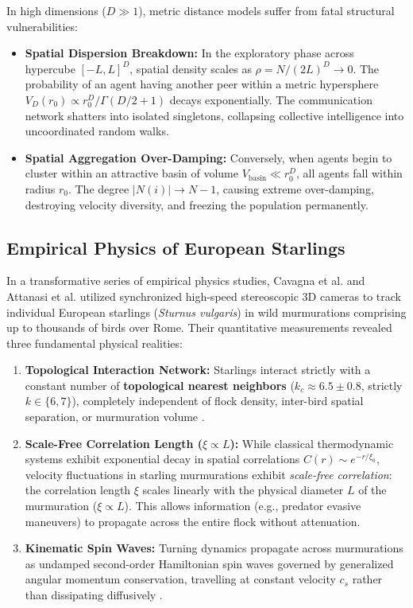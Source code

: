 \documentclass[journal]{IEEEtran}
\begin{document}
In high dimensions ($D \gg 1$), metric distance models suffer from fatal structural vulnerabilities:
\begin{itemize}
    \item \textbf{Spatial Dispersion Breakdown:} In the exploratory phase across hypercube $[-L, L]^D$, spatial density scales as $\rho = N / (2L)^D \to 0$. The probability of an agent having another peer within a metric hypersphere $V_D(r_0) \propto r_0^D / \Gamma(D/2 + 1)$ decays exponentially. The communication network shatters into isolated singletons, collapsing collective intelligence into uncoordinated random walks.
    \item \textbf{Spatial Aggregation Over-Damping:} Conversely, when agents begin to cluster within an attractive basin of volume $V_{\text{basin}} \ll r_0^D$, all agents fall within radius $r_0$. The degree $|N(i)| \to N - 1$, causing extreme over-damping, destroying velocity diversity, and freezing the population permanently.
\end{itemize}

\subsection{Empirical Physics of European Starlings}
In a transformative series of empirical physics studies, Cavagna et al. \cite{cavagna2010scale} and Attanasi et al. \cite{attanasi2014information} utilized synchronized high-speed stereoscopic 3D cameras to track individual European starlings (\textit{Sturnus vulgaris}) in wild murmurations comprising up to thousands of birds over Rome. Their quantitative measurements revealed three fundamental physical realities:
\begin{enumerate}
    \item \textbf{Topological Interaction Network:} Starlings interact strictly with a constant number of \textbf{topological nearest neighbors} ($k_c \approx 6.5 \pm 0.8$, strictly $k \in \{6, 7\}$), completely independent of flock density, inter-bird spatial separation, or murmuration volume \cite{cavagna2010scale}.
    \item \textbf{Scale-Free Correlation Length ($\xi \propto L$):} While classical thermodynamic systems exhibit exponential decay in spatial correlations $C(r) \sim e^{-r/\xi_0}$, velocity fluctuations in starling murmurations exhibit \textit{scale-free correlation}: the correlation length $\xi$ scales linearly with the physical diameter $L$ of the murmuration ($\xi \propto L$). This allows information (e.g., predator evasive maneuvers) to propagate across the entire flock without attenuation.
    \item \textbf{Kinematic Spin Waves:} Turning dynamics propagate across murmurations as undamped second-order Hamiltonian spin waves governed by generalized angular momentum conservation, travelling at constant velocity $c_s$ rather than dissipating diffusively \cite{attanasi2014information}.
\end{enumerate}
\end{document}
